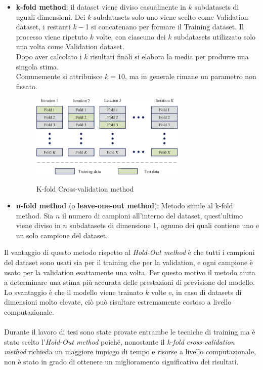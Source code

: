                 \begin{itemize}
                    \item \textbf{k-fold method}: il dataset viene diviso casualmente in $k$ subdatasets di uguali dimensioni. Dei $k$ subdatasets solo uno viene scelto come Validation dataset, i restanti $k-$1 si concatenano per formare il Training dataset. Il processo viene ripetuto $k$ volte, con ciascuno dei $k$ subdatasets utilizzato solo una volta come Validation dataset.\\
                    Dopo aver calcolato i $k$ risultati finali si elabora la media per produrre una singola stima.\\
                    Comunemente si attribuisce $k=10$, ma in generale rimane un parametro non fissato. 
                        \begin{figure}[!h]
                            \centering
                            \includegraphics[width=0.7\textwidth]{Images/Datasets/K-fold-cross-validation-method.png}
                            \label{K-fold-cross-validation}
                            \caption{K-fold Cross-validation method}
                        \end{figure}
                    \item \textbf{n-fold method} (o \textbf{leave-one-out method}): Metodo simile al k-fold method.
                    Sia $n$ il numero di campioni all'interno del dataset, quest'ultimo viene diviso in $n$ subdatasets di dimensione 1, ognuno dei quali contiene uno e un solo campione del dataset.
                \end{itemize}
                
                Il vantaggio di questo metodo rispetto al \textit{Hold-Out method} è che tutti i campioni del dataset sono usati sia per il training che per la validation, e ogni campione è usato per la validation esattamente una volta. Per questo motivo il metodo aiuta a determinare una stima più accurata delle prestazioni di previsione del modello.
                Lo svantaggio è che il modello viene trainato $k$ volte e, in caso di datasets di dimensioni molto elevate, ciò può risultare estremamente costoso a livello computazionale.\\\\
            Durante il lavoro di tesi sono state provate entrambe le tecniche di training ma è stato scelto l'\textit{Hold-Out method} poiché, nonostante il \textit{k-fold cross-validation method} richieda un maggiore impiego di tempo e risorse a livello computazionale, non è stato in grado di ottenere un miglioramento significativo dei risultati.
                
